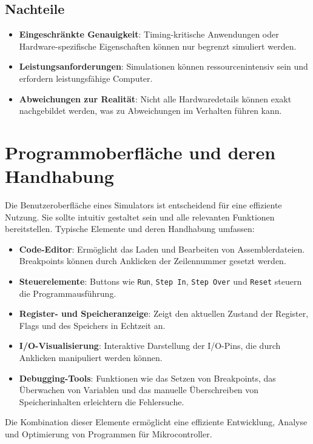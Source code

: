 \subsection*{Nachteile}
\begin{itemize}
    \item \textbf{Eingeschränkte Genauigkeit}: Timing-kritische Anwendungen oder Hardware-spezifische Eigenschaften können nur begrenzt simuliert werden.
    \item \textbf{Leistungsanforderungen}: Simulationen können ressourcenintensiv sein und erfordern leistungsfähige Computer.
    \item \textbf{Abweichungen zur Realität}: Nicht alle Hardwaredetails können exakt nachgebildet werden, was zu Abweichungen im Verhalten führen kann.
\end{itemize}

\section{Programmoberfläche und deren Handhabung}

Die Benutzeroberfläche eines Simulators ist entscheidend für eine effiziente Nutzung. Sie sollte intuitiv gestaltet sein und alle relevanten Funktionen bereitstellen. Typische Elemente und deren Handhabung umfassen:

\begin{itemize}
    \item \textbf{Code-Editor}: Ermöglicht das Laden und Bearbeiten von Assemblerdateien. Breakpoints können durch Anklicken der Zeilennummer gesetzt werden.
    \item \textbf{Steuerelemente}: Buttons wie \texttt{Run}, \texttt{Step In}, \texttt{Step Over} und \texttt{Reset} steuern die Programmausführung.
    \item \textbf{Register- und Speicheranzeige}: Zeigt den aktuellen Zustand der Register, Flags und des Speichers in Echtzeit an.
    \item \textbf{I/O-Visualisierung}: Interaktive Darstellung der I/O-Pins, die durch Anklicken manipuliert werden können.
    \item \textbf{Debugging-Tools}: Funktionen wie das Setzen von Breakpoints, das Überwachen von Variablen und das manuelle Überschreiben von Speicherinhalten erleichtern die Fehlersuche.
\end{itemize}

Die Kombination dieser Elemente ermöglicht eine effiziente Entwicklung, Analyse und Optimierung von Programmen für Mikrocontroller.





